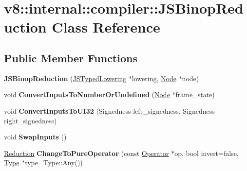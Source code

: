 \hypertarget{classv8_1_1internal_1_1compiler_1_1_j_s_binop_reduction}{}\section{v8\+:\+:internal\+:\+:compiler\+:\+:J\+S\+Binop\+Reduction Class Reference}
\label{classv8_1_1internal_1_1compiler_1_1_j_s_binop_reduction}
\subsection*{Public Member Functions}
\begin{DoxyCompactItemize}
\item 
{\bfseries J\+S\+Binop\+Reduction} (\hyperlink{classv8_1_1internal_1_1compiler_1_1_j_s_typed_lowering}{J\+S\+Typed\+Lowering} $\ast$lowering, \hyperlink{classv8_1_1internal_1_1compiler_1_1_node}{Node} $\ast$node)\hypertarget{classv8_1_1internal_1_1compiler_1_1_j_s_binop_reduction_ab9693e05ed9560c2c8f147e4ffbeef4f}{}\label{classv8_1_1internal_1_1compiler_1_1_j_s_binop_reduction_ab9693e05ed9560c2c8f147e4ffbeef4f}

\item 
void {\bfseries Convert\+Inputs\+To\+Number\+Or\+Undefined} (\hyperlink{classv8_1_1internal_1_1compiler_1_1_node}{Node} $\ast$frame\+\_\+state)\hypertarget{classv8_1_1internal_1_1compiler_1_1_j_s_binop_reduction_a5422bd75dccebc1db91f9ee64612547e}{}\label{classv8_1_1internal_1_1compiler_1_1_j_s_binop_reduction_a5422bd75dccebc1db91f9ee64612547e}

\item 
void {\bfseries Convert\+Inputs\+To\+U\+I32} (Signedness left\+\_\+signedness, Signedness right\+\_\+signedness)\hypertarget{classv8_1_1internal_1_1compiler_1_1_j_s_binop_reduction_a324487f05e21c0cbf8deade5d02d2323}{}\label{classv8_1_1internal_1_1compiler_1_1_j_s_binop_reduction_a324487f05e21c0cbf8deade5d02d2323}

\item 
void {\bfseries Swap\+Inputs} ()\hypertarget{classv8_1_1internal_1_1compiler_1_1_j_s_binop_reduction_a8a83369e484a9816711b052b914d2b75}{}\label{classv8_1_1internal_1_1compiler_1_1_j_s_binop_reduction_a8a83369e484a9816711b052b914d2b75}

\item 
\hyperlink{classv8_1_1internal_1_1compiler_1_1_reduction}{Reduction} {\bfseries Change\+To\+Pure\+Operator} (const \hyperlink{classv8_1_1internal_1_1compiler_1_1_operator}{Operator} $\ast$op, bool invert=false, \hyperlink{classv8_1_1internal_1_1_type}{Type} $\ast$type=Type\+::\+Any())\hypertarget{classv8_1_1internal_1_1compiler_1_1_j_s_binop_reduction_a321e8f733fb2e68760855325a7d04c31}{}\label{classv8_1_1internal_1_1compiler_1_1_j_s_binop_reduction_a321e8f733fb2e68760855325a7d04c31}


\end{DoxyCompactItemize}
